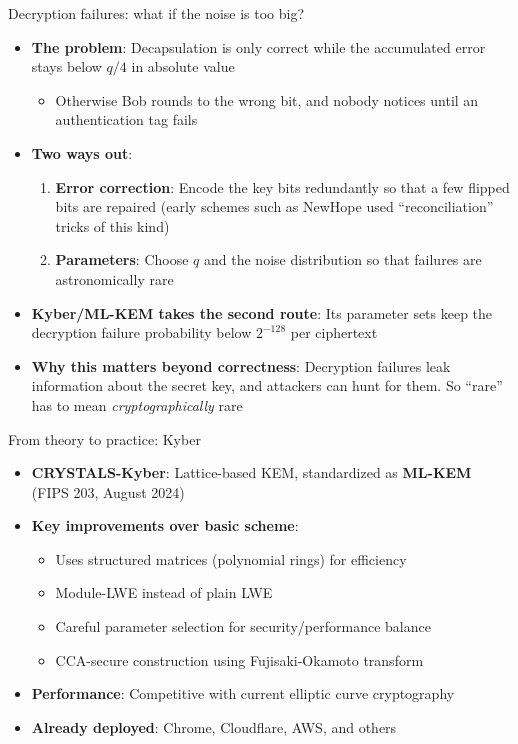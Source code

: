 \ifdefined\PRESENTATION\else\PassOptionsToClass{handout}{beamer}\fi\documentclass[aspectratio=169, lualatex]{beamer}
\begin{document}
\begin{frame}{Decryption failures: what if the noise is too big?}
	\begin{itemize}
		\item \textbf{The problem}: Decapsulation is only correct while the accumulated error stays below $q/4$ in absolute value
		      \begin{itemize}
			      \item Otherwise Bob rounds to the wrong bit, and nobody notices until an authentication tag fails
		      \end{itemize}
		\item \textbf{Two ways out}:
		      \begin{enumerate}
			      \item \textbf{Error correction}: Encode the key bits redundantly so that a few flipped bits are repaired (early schemes such as NewHope used ``reconciliation'' tricks of this kind)
			      \item \textbf{Parameters}: Choose $q$ and the noise distribution so that failures are astronomically rare
		      \end{enumerate}
		\item \textbf{Kyber/ML-KEM takes the second route}: Its parameter sets keep the decryption failure probability below $2^{-128}$ per ciphertext
		\item \textbf{Why this matters beyond correctness}: Decryption failures leak information about the secret key, and attackers can hunt for them. So ``rare'' has to mean \textit{cryptographically} rare
	\end{itemize}
\end{frame}

\begin{frame}{From theory to practice: Kyber}
	\begin{itemize}
		\item \textbf{CRYSTALS-Kyber}: Lattice-based KEM, standardized as \textbf{ML-KEM} (FIPS 203, August 2024)
		\item \textbf{Key improvements over basic scheme}:
		      \begin{itemize}
			      \item Uses structured matrices (polynomial rings) for efficiency
			      \item Module-LWE instead of plain LWE
			      \item Careful parameter selection for security/performance balance
			      \item CCA-secure construction using Fujisaki-Okamoto transform
		      \end{itemize}
		\item \textbf{Performance}: Competitive with current elliptic curve cryptography
		\item \textbf{Already deployed}: Chrome, Cloudflare, AWS, and others
	\end{itemize}
\end{frame}
\end{document}
